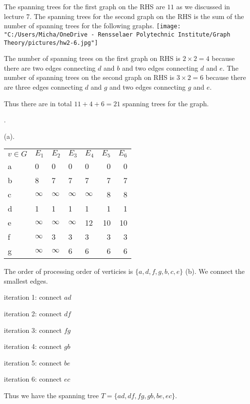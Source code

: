 \documentclass[12pt]{article}
\begin{document}
	The spanning trees for the first graph on the RHS are $11$ as we discussed in lecture 7. The spanning trees for the second graph on the RHS is the sum of the number of spanning trees for the following graphs.
	\texttt{[image: "C:/Users/Micha/OneDrive - Rensselaer Polytechnic Institute/Graph Theory/pictures/hw2-6.jpg"]}
	
	The number of spanning trees on the first graph on RHS is $2\times 2 = 4$ because there are two edges connecting $d$ and $b$ and two edges connecting $d$ and $e$. The number of spanning trees on the second graph on RHS is $3 \times 2 = 6$ because there are three edges connecting $d$ and $g$ and two edges connecting $g$ and $e$. 
	
	Thus there are in total $11+4+6 = 21$ spanning trees for the graph. 
	
	.
	
(a).\\

\begin{tabular}{lllllrr}
	$v\in G$ &       $E_1$ &       $E_2$ &       $E_3$ &       $E_4$ &  $E_5$ &  $E_6$ \\
	a &         0 &         0 &         0 &         0 &    0 &    0    \\
	b &         8 &         7 &         7 &         7 &    7 &    7     \\
	c &  $\infty$ &  $\infty$ &  $\infty$ &  $\infty$ &    8 &    8     \\
	d &         1 &         1 &         1 &         1 &    1 &    1     \\
	e &  $\infty$ &  $\infty$ &  $\infty$ &        12 &   10 &   10    \\
	f &  $\infty$ &         3 &         3 &         3 &    3 &    3     \\
	g &  $\infty$ &  $\infty$ &         6 &         6 &    6 &    6      \\
\end{tabular}
The order of processing order of verticies is $\{a,d,f,g,b,c,e\}$
(b).
We connect the smallest edges.

iteration 1: connect $ad$

iteration 2: connect $df$

iteration 3: connect $fg$

iteration 4: connect $gb$

iteration 5: connect $be$

iteration 6: connect $ec$

Thus we have the spanning tree $T = \{ad,df,fg,gb,be,ec\}$.
\end{document}
